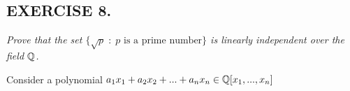 \documentclass{article}
\begin{document}
\subsection*{EXERCISE 8.}
\emph{\color{pink}Prove that the set $\{\sqrt{p}\;:\;p\text{ is a prime number}\}$ is linearly independent over the field $\mathbb{Q}$.}
\smallskip

Consider a polynomial $a_1x_1+a_2x_2+...+a_nx_n\in\mathbb{Q}[x_1,...,x_n]$
\end{document}
